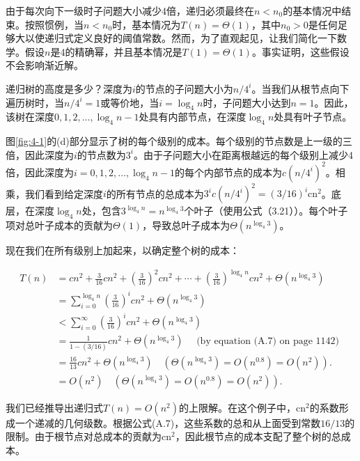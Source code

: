 \documentclass[lang=cn,newtx,10pt,scheme=chinese]{elegantbook}
\begin{document}
由于每次向下一级时子问题大小减少4倍，递归必须最终在$n<n_0$的基本情况中结束。按照惯例，当$n<n_0$时，基本情况为$T(n)=\Theta(1)$，其中$n_0>0$是任何足够大以使递归式定义良好的阈值常数。然而，为了直观起见，让我们简化一下数学。假设$n$是4的精确幂，并且基本情况是$T(1)=\Theta(1)$。事实证明，这些假设不会影响渐近解。

递归树的高度是多少？深度为$i$的节点的子问题大小为$n / 4^i$。当我们从根节点向下遍历树时，当$n / 4^i=1$或等价地，当$i=\log _4 n$时，子问题大小达到$n=1$。因此，该树在深度$0,1,2,\ldots,\log _4 n-1$处具有内部节点，在深度$\log _4 n$处具有叶子节点。

图\ref{fig:4-1}的(d)部分显示了树的每个级别的成本。每个级别的节点数是上一级的三倍，因此深度为$i$的节点数为$3^i$。由于子问题大小在距离根越远的每个级别上减少4倍，因此深度为$i=0,1,2,\ldots,\log _4 n-1$的每个内部节点的成本为$c\left(n / 4^i\right)^2$。相乘，我们看到给定深度$i$的所有节点的总成本为$3^ic\left(n / 4^i\right)^2=(3 / 16)^i \mathrm{cn}^2$。底层，在深度$\log _4 n$处，包含$3^{\log _4 n}=n^{\log _4 3}$个叶子（使用公式（3.21））。每个叶子项对总叶子成本的贡献为$\Theta(1)$，导致总叶子成本为$\Theta\left(n^{\log _4 3}\right)$。

现在我们在所有级别上加起来，以确定整个树的成本：

$$
\begin{aligned}
T(n) & =c n^2+\frac{3}{16} c n^2+\left(\frac{3}{16}\right)^2 c n^2+\cdots+\left(\frac{3}{16}\right)^{\log _4 n} c n^2+\Theta\left(n^{\log _4 3}\right) \\
& =\sum_{i=0}^{\log _4 n}\left(\frac{3}{16}\right)^i c n^2+\Theta\left(n^{\log _4 3}\right) \\
& <\sum_{i=0}^{\infty}\left(\frac{3}{16}\right)^i c n^2+\Theta\left(n^{\log _4 3}\right) \\
& =\frac{1}{1-(3 / 16)} c n^2+\Theta\left(n^{\log _4 3}\right) \quad \text { (by equation (A.7) on page 1142) } \\
& =\frac{16}{13} c n^2+\Theta\left(n^{\log _4 3}\right) \quad\left(\Theta\left(n^{\log _4 3}\right)=O\left(n^{0.8}\right)=O\left(n^2\right)\right) . \\
& =O\left(n^2\right) \quad\left(\Theta\left(n^{\log _4 3}\right)=O\left(n^{0.8}\right)=O\left(n^2\right)\right) .
\end{aligned}
$$

我们已经推导出递归式$T(n)=O\left(n^2\right)$的上限解。在这个例子中，$\mathrm{cn}^2$的系数形成一个递减的几何级数。根据公式(A.7)，这些系数的总和从上面受到常数$16/13$的限制。由于根节点对总成本的贡献为$\mathrm{cn}^2$，因此根节点的成本支配了整个树的总成本。
\end{document}
